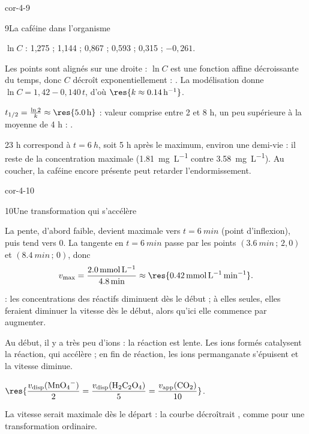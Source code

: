 \begin{blocLivre}{cor-4-9}
\begin{corrige}{9}{La caféine dans l'organisme}
\begin{questions}
\item $\ln C$ : 1,275 ; 1,144 ; 0,867 ; 0,593 ; 0,315 ; $-0{,}261$.
\item Les points sont alignés sur une droite : $\ln C$ est une fonction affine décroissante du temps, donc $C$ décroît
exponentiellement : . La modélisation donne $\ln C=1{,}42-0{,}140\,t$, d'où
$\res{k\approx\qty{0,14}{h^{-1}}}$.
\item $t_{1/2}=\frac{\ln2}{k}\approx\res{\qty{5,0}{h}}$ : valeur comprise entre 2 et 8 h, un peu supérieure à la moyenne
de 4 h : .
\item 23 h correspond à $t=\qty{6}{h}$, soit 5 h après le maximum, environ une demi-vie : il reste
 de la concentration maximale (\qty{1,81}{mg.L^{-1}} contre \qty{3,58}{mg.L^{-1}}). Au coucher,
la caféine encore présente peut retarder l'endormissement.
\end{questions}
\end{corrige}
\end{blocLivre}
\begin{blocLivre}{cor-4-10}
\begin{corrige}{10}{Une transformation qui s'accélère}
\begin{questions}
\item La pente, d'abord faible, devient maximale vers $t=\qty{6}{min}$ (point d'inflexion), puis tend vers 0. La
tangente en $t=\qty{6}{min}$ passe par les points $(\qty{3,6}{min}\,;\,2{,}0)$ et $(\qty{8,4}{min}\,;\,0)$, donc
\[v_{\max}=\frac{\qty{2,0}{mmol.L^{-1}}}{\qty{4,8}{min}}\approx\res{\qty{0,42}{mmol.L^{-1}.min^{-1}}}.\]
\item {} : les concentrations des réactifs diminuent dès le début ; à elles seules, elles feraient
diminuer la vitesse dès le début, alors qu'ici elle commence par augmenter.
\item Au début, il y a très peu d'ions  : la réaction est lente. Les ions  formés catalysent la
réaction, qui accélère ; en fin de réaction, les ions permanganate s'épuisent et la vitesse diminue.
\item $\res{\dfrac{v_\mathrm{disp}(\ce{MnO4-})}{2}=\dfrac{v_\mathrm{disp}(\ce{H2C2O4})}{5}=\dfrac{v_\mathrm{app}(\ce{CO2})}{10}}$.
\item La vitesse serait maximale dès le départ : la courbe décroîtrait , comme pour une
transformation ordinaire.
\end{questions}
\end{corrige}
\end{blocLivre}
